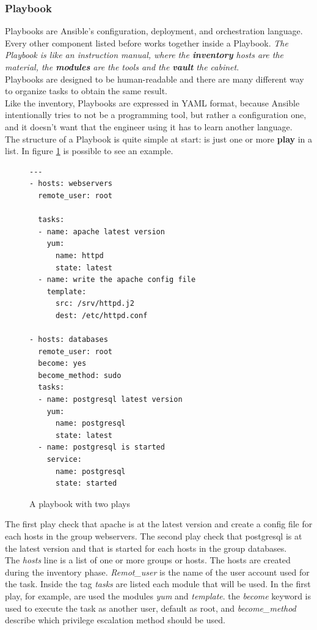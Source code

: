 \documentclass[conference]{IEEEtran}
\begin{document}
\subsubsection{Playbook}
Playbooks are Ansible's configuration, deployment, and orchestration language. Every other component listed before works together inside a Playbook. \textit{The Playbook is like an instruction manual, where the \textbf{inventory} hosts are the material, the \textbf{modules} are the tools and the \textbf{vault} the cabinet}.\\
Playbooks are designed to be human-readable and there are many different way to organize tasks to obtain the same result.\\
Like the inventory, Playbooks are expressed in YAML format, because Ansible intentionally tries to not be a programming tool, but rather a configuration one, and it doesn't want that the engineer using it has to learn another language.\\
The structure of a Playbook is quite simple at start: is just one or more \textbf{play} in a list. In figure \ref{playbook} is possible to see an example.
\begin{figure}
\begin{verbatim}
---
- hosts: webservers
  remote_user: root

  tasks:
  - name: apache latest version
    yum:
      name: httpd
      state: latest
  - name: write the apache config file
    template:
      src: /srv/httpd.j2
      dest: /etc/httpd.conf

- hosts: databases
  remote_user: root
  become: yes
  become_method: sudo
  tasks:
  - name: postgresql latest version
    yum:
      name: postgresql
      state: latest
  - name: postgresql is started
    service:
      name: postgresql
      state: started

  \end{verbatim}
  \caption{A playbook with two plays}
  \label{playbook}
\end{figure}
The first play check that apache is at the latest version and create a config file for each hosts in the group webservers.
The second play check that postgresql is at the latest version and that is started for each hosts in the group databases.\\
The \textit{hosts} line is a list of one or more groups or hosts. The hosts are created during the inventory phase.
\textit{Remot\_user} is the name of the user account used for the task. Inside the tag \textit{tasks} are listed each module that will be used. In the first play, for example, are used the modules \textit{yum} and \textit{template}. the \textit{become} keyword is used to execute the task as another user, default as root, and \textit{become\_method} describe which privilege escalation method should be used.\\
\end{document}
